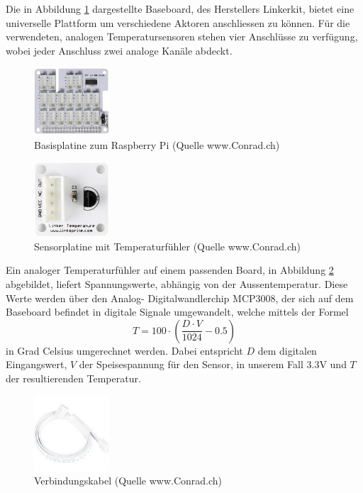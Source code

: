 Die in Abbildung \ref{fig:plate} dargestellte Baseboard, des Herstellers Linkerkit, bietet eine universelle Plattform um verschiedene Aktoren anschliessen zu können. Für die verwendeten, analogen Temperatursensoren stehen vier Anschlüsse zu verfügung, wobei jeder Anschluss zwei analoge Kanäle abdeckt.

\begin{figure}[H]%
\centering
\includegraphics[width=0.25\textwidth]{Images/Basisplatine.jpg}
\caption{Basisplatine zum Raspberry Pi (Quelle www.Conrad.ch)}
\label{fig:plate}
\end{figure}

\begin{figure}[H]%
\centering
\includegraphics[width=0.25\textwidth]{Images/Sensorplatine.jpg}
\caption{Sensorplatine mit Temperaturfühler (Quelle www.Conrad.ch)}
\label{fig:sensor}
\end{figure}

Ein analoger Temperaturfühler auf einem passenden Board, in Abbildung \ref{fig:sensor} abgebildet, liefert Spannungswerte, abhängig von der Aussentemperatur. Diese Werte werden über den Analog- Digitalwandlerchip MCP3008, der sich auf dem Baseboard befindet in digitale Signale umgewandelt, welche mittels der Formel
\[
	T = 100 \cdot \left( \frac{D \cdot V}{1024} - 0.5 \right) 
\]
in Grad Celsius umgerechnet werden. Dabei entspricht $D$ dem digitalen Eingangswert, $V$ der Speisespannung für den Sensor, in unserem Fall 3.3V und $T$ der resultierenden Temperatur.

\begin{figure}[H]%
\centering
\includegraphics[width=0.25\textwidth]{Images/Verbindungskabel.jpg}
\caption{Verbindungskabel (Quelle www.Conrad.ch)}
\label{fig:cable}
\end{figure}

